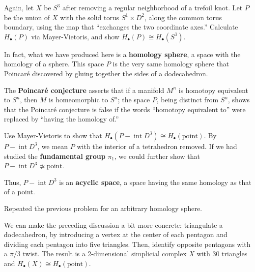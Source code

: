 \documentclass[12pt]{pset}
\DeclareMathOperator{\interior}{int}
\begin{document}
\begin{problem}
  Again, let $X$ be $S^3$ after removing a regular neighborhood of a
  trefoil knot.  Let $P$ be the union of $X$ with the solid torus $S^1
  \times D^2$, along the common torus boundary, using the map that
  ``exchanges the two coordinate axes.''  Calculate $H_\bullet(P)$ via Mayer-Vietoris, and show
  $H_\bullet(P) \cong H_\bullet(S^3)$.

  In fact, what we have produced here is a \textbf{homology sphere}, a
  space with the homology of a sphere.  This space $P$ is the very
  same homology sphere that Poincar\'e discovered by gluing together
  the sides of a dodecahedron.

  The \textbf{Poincar\'e conjecture} asserts that if a manifold $M^n$
  is homotopy equivalent to $S^n$, then $M$ is homeomorphic to $S^n$;
  the space $P$, being distinct from $S^n$, shows that the Poincar\'e
  conjecture is false if the words ``homotopy equivalent to'' were
  replaced by ``having the homology of.''
\end{problem}

\begin{problem}
  Use Mayer-Vietoris to show that $H_\bullet(P - \interior D^3) \cong
  H_\bullet(\mbox{point})$.  By $P - \interior D^3$, we mean $P$ with the interior
  of a tetrahedron removed.  If we had studied the
  \textbf{fundamental group} $\pi_1$, we could further show that $P -
  \interior D^3 \not\simeq \mbox{point}$.

  Thus, $P - \interior D^3$ is an \textbf{acyclic space}, a space having the
  same homology as that of a point.
\end{problem}

\begin{problem}
  Repeated the previous problem for an arbitrary homology sphere.
\end{problem}

\begin{requiredproblem}
  We can make the preceding discussion a bit more concrete:
  triangulate a dodecahedron, by introducing a vertex at the center of
  each pentagon and dividing each pentagon into five triangles.  Then,
  identify opposite pentagons with a $\pi/3$ twist.  The result is a
  2-dimensional simplicial complex $X$ with 30 triangles and
  $H_\bullet(X) \cong H_\bullet(\mbox{point})$.

\end{requiredproblem}
\end{document}
